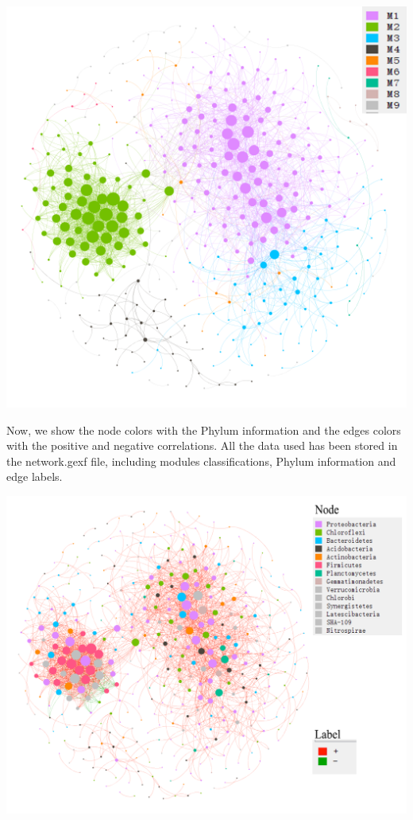 \documentclass[
]{book}
\begin{document}
\begin{center}\includegraphics[width=550px]{Images/network1_spearman} \end{center}

Now, we show the node colors with the Phylum information and the edges colors with the positive and negative correlations.
All the data used has been stored in the network.gexf file, including modules classifications, Phylum information and edge labels.

\begin{center}\includegraphics[width=550px]{Images/network2_spearman} \end{center}
\end{document}
